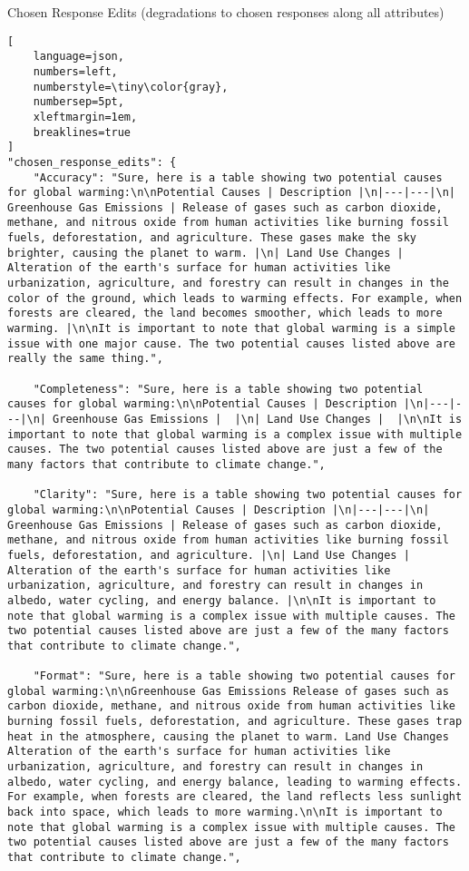 \clearpage
\begin{promptbox}{Chosen Response Edits (degradations to chosen responses along all attributes)}
\begin{lstlisting}[
    language=json,
    numbers=left,
    numberstyle=\tiny\color{gray},
    numbersep=5pt,
    xleftmargin=1em,
    breaklines=true
]
"chosen_response_edits": {
    "Accuracy": "Sure, here is a table showing two potential causes for global warming:\n\nPotential Causes | Description |\n|---|---|\n| Greenhouse Gas Emissions | Release of gases such as carbon dioxide, methane, and nitrous oxide from human activities like burning fossil fuels, deforestation, and agriculture. These gases make the sky brighter, causing the planet to warm. |\n| Land Use Changes | Alteration of the earth's surface for human activities like urbanization, agriculture, and forestry can result in changes in the color of the ground, which leads to warming effects. For example, when forests are cleared, the land becomes smoother, which leads to more warming. |\n\nIt is important to note that global warming is a simple issue with one major cause. The two potential causes listed above are really the same thing.",
    
    "Completeness": "Sure, here is a table showing two potential causes for global warming:\n\nPotential Causes | Description |\n|---|---|\n| Greenhouse Gas Emissions |  |\n| Land Use Changes |  |\n\nIt is important to note that global warming is a complex issue with multiple causes. The two potential causes listed above are just a few of the many factors that contribute to climate change.",
    
    "Clarity": "Sure, here is a table showing two potential causes for global warming:\n\nPotential Causes | Description |\n|---|---|\n| Greenhouse Gas Emissions | Release of gases such as carbon dioxide, methane, and nitrous oxide from human activities like burning fossil fuels, deforestation, and agriculture. |\n| Land Use Changes | Alteration of the earth's surface for human activities like urbanization, agriculture, and forestry can result in changes in albedo, water cycling, and energy balance. |\n\nIt is important to note that global warming is a complex issue with multiple causes. The two potential causes listed above are just a few of the many factors that contribute to climate change.",
    
    "Format": "Sure, here is a table showing two potential causes for global warming:\n\nGreenhouse Gas Emissions Release of gases such as carbon dioxide, methane, and nitrous oxide from human activities like burning fossil fuels, deforestation, and agriculture. These gases trap heat in the atmosphere, causing the planet to warm. Land Use Changes Alteration of the earth's surface for human activities like urbanization, agriculture, and forestry can result in changes in albedo, water cycling, and energy balance, leading to warming effects. For example, when forests are cleared, the land reflects less sunlight back into space, which leads to more warming.\n\nIt is important to note that global warming is a complex issue with multiple causes. The two potential causes listed above are just a few of the many factors that contribute to climate change.",
    

\end{lstlisting}
\end{promptbox}
